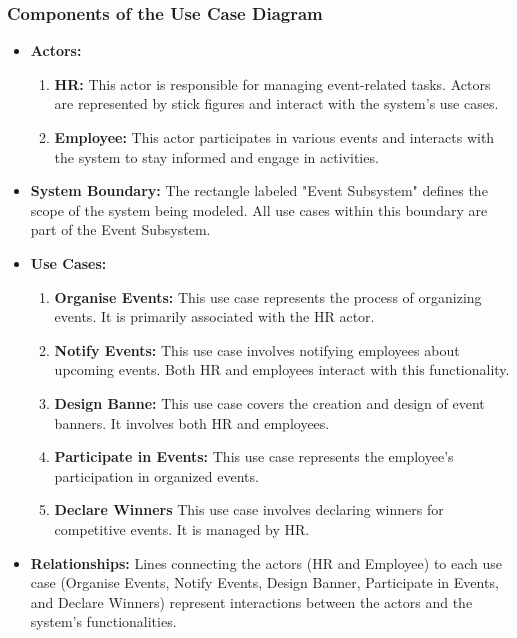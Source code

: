 \subsubsection{Components of the Use Case Diagram }
\begin{itemize}
    \item \textbf{Actors: }
    \begin{enumerate}
        \item \textbf{HR: }This actor is responsible for managing event-related tasks. Actors are represented by stick figures and interact with the system's use cases. 
        \item \textbf{Employee: }This actor participates in various events and interacts with the system to stay informed and engage in activities. 
    \end{enumerate}
    \item \textbf{System Boundary: }The rectangle labeled "Event Subsystem" defines the scope of the system being modeled. All use cases within this boundary are part of the Event Subsystem. 
    \item \textbf{Use Cases: }
    \begin{enumerate}
        \item \textbf{Organise Events: }This use case represents the process of organizing events. It is primarily associated with the HR actor. 
        \item \textbf{Notify Events: }This use case involves notifying employees about upcoming events. Both HR and employees interact with this functionality. 
        \item \textbf{Design Banne: } This use case covers the creation and design of event banners. It involves both HR and employees.  
        \item  \textbf{Participate in Events: } This use case represents the employee's participation in organized events. 
        \item  \textbf{Declare Winners } This use case involves declaring winners for competitive events. It is managed by HR.
    \end{enumerate}
    \item \textbf{Relationships: } Lines connecting the actors (HR and Employee) to each use case (Organise Events, Notify Events, Design Banner, Participate in Events, and Declare Winners) represent interactions between the actors and the system's functionalities. 
\end{itemize}

